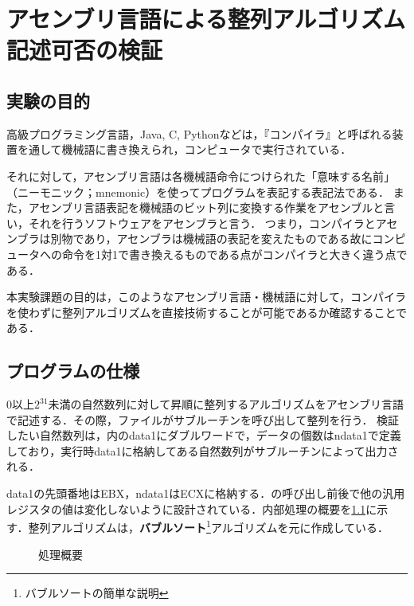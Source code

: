 \chapter{アセンブリ言語による整列アルゴリズム記述可否の検証}
\section{実験の目的}
高級プログラミング言語，{\ttfamily Java, C, Python}などは，『コンパイラ』と呼ばれる装置を通して機械語に書き換えられ，コンピュータで実行されている．\par
それに対して，アセンブリ言語は各機械語命令につけられた「意味する名前」（ニーモニック；mnemonic）を使ってプログラムを表記する表記法である．\cite{pl2text}
また，アセンブリ言語表記を機械語のビット列に変換する作業をアセンブルと言い，それを行うソフトウェアをアセンブラと言う．
つまり，コンパイラとアセンブラは別物であり，アセンブラは機械語の表記を変えたものである故にコンピュータへの命令を1対1で書き換えるものである点がコンパイラと大きく違う点である．\par
本実験課題の目的は，このようなアセンブリ言語・機械語に対して，コンパイラを使わずに整列アルゴリズムを直接技術することが可能であるか確認することである．
\section{プログラムの仕様}
\(0\)以上\(2^{31}\)未満の自然数列に対して昇順に整列するアルゴリズムをアセンブリ言語で記述する．その際，\testsort ファイルが\sort サブルーチンを呼び出して整列を行う．
検証したい自然数列は，\testsort 内の{\ttfamily data1}にダブルワードで，データの個数は{\ttfamily ndata1}で定義しており，\testsort 実行時{\ttfamily data1}に格納してある自然数列が\print サブルーチンによって出力される．\par
{\ttfamily data1}の先頭番地は{\ttfamily EBX}，{\ttfamily ndata1}は{\ttfamily ECX}に格納する．\sort の呼び出し前後で他の汎用レジスタの値は変化しないように設計されている．内部処理の概要を\ref{kadai1:abs}に示す．整列アルゴリズムは，\textbf{バブルソート}\footnote{バブルソートの簡単な説明}アルゴリズムを元に作成している．
\begin{figure}[H]
    \centering
    \caption{処理概要}
    \label{kadai1:abs}
\end{figure}
